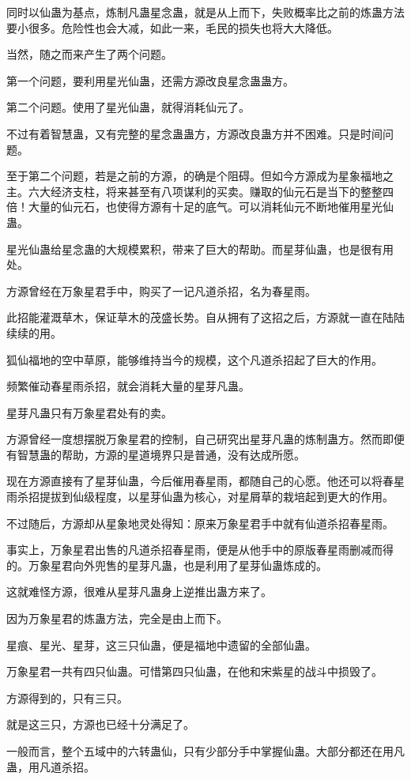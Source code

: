 \begin{this_body}
同时以仙蛊为基点，炼制凡蛊星念蛊，就是从上而下，失败概率比之前的炼蛊方法要小很多。危险性也会大减，如此一来，毛民的损失也将大大降低。

当然，随之而来产生了两个问题。

第一个问题，要利用星光仙蛊，还需方源改良星念蛊蛊方。

第二个问题。使用了星光仙蛊，就得消耗仙元了。

不过有着智慧蛊，又有完整的星念蛊蛊方，方源改良蛊方并不困难。只是时间问题。

至于第二个问题，若是之前的方源，的确是个阻碍。但如今方源成为星象福地之主。六大经济支柱，将来甚至有八项谋利的买卖。赚取的仙元石是当下的整整四倍！大量的仙元石，也使得方源有十足的底气。可以消耗仙元不断地催用星光仙蛊。

星光仙蛊给星念蛊的大规模累积，带来了巨大的帮助。而星芽仙蛊，也是很有用处。

方源曾经在万象星君手中，购买了一记凡道杀招，名为春星雨。

此招能灌溉草木，保证草木的茂盛长势。自从拥有了这招之后，方源就一直在陆陆续续的用。

狐仙福地的空中草原，能够维持当今的规模，这个凡道杀招起了巨大的作用。

频繁催动春星雨杀招，就会消耗大量的星芽凡蛊。

星芽凡蛊只有万象星君处有的卖。

方源曾经一度想摆脱万象星君的控制，自己研究出星芽凡蛊的炼制蛊方。然而即便有智慧蛊的帮助，方源的星道境界只是普通，没有达成所愿。

现在方源直接有了星芽仙蛊，今后催用春星雨，都随自己的心愿。他还可以将春星雨杀招提拔到仙级程度，以星芽仙蛊为核心，对星屑草的栽培起到更大的作用。

不过随后，方源却从星象地灵处得知：原来万象星君手中就有仙道杀招春星雨。

事实上，万象星君出售的凡道杀招春星雨，便是从他手中的原版春星雨删减而得的。万象星君向外兜售的星芽凡蛊，也是利用了星芽仙蛊炼成的。

这就难怪方源，很难从星芽凡蛊身上逆推出蛊方来了。

因为万象星君的炼蛊方法，完全是由上而下。

星痕、星光、星芽，这三只仙蛊，便是福地中遗留的全部仙蛊。

万象星君一共有四只仙蛊。可惜第四只仙蛊，在他和宋紫星的战斗中损毁了。

方源得到的，只有三只。

就是这三只，方源也已经十分满足了。

一般而言，整个五域中的六转蛊仙，只有少部分手中掌握仙蛊。大部分都还在用凡蛊，用凡道杀招。


\end{this_body}
